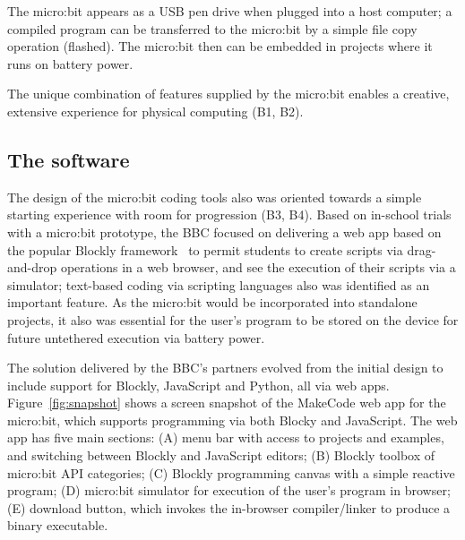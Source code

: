The micro:bit appears as a USB pen drive when plugged into a host computer;
a compiled program can be transferred to the micro:bit by a simple file copy
operation (flashed). The micro:bit then can be embedded in projects
where it runs on battery power.

The unique combination of features supplied by the micro:bit enables a creative,
extensive experience for physical computing (B1, B2). 

\subsection{The software}

The design of the micro:bit coding tools also was oriented towards a
simple starting experience with room for progression (B3, B4). Based on in-school trials with a micro:bit prototype, the BBC focused on delivering a web app
based on the popular Blockly framework~\cite{Blocky2015} to permit students to
create scripts via drag-and-drop operations in a web browser, and see
the execution of their scripts via a simulator; text-based coding via scripting languages also
was identified as an important feature. As the micro:bit would be incorporated
into standalone projects, it also was essential for the user's program to be stored on the device for future untethered execution via battery power.



The solution delivered by the BBC's partners evolved from the initial
design to include support for Blockly, JavaScript and Python, all
via web apps.
Figure~\ref{fig:snapshot} shows a screen snapshot of the MakeCode web app
for the micro:bit,
which supports programming via both Blocky and JavaScript.
The web app has five main sections: (A) menu bar with access to projects
and examples, and switching between Blockly and JavaScript editors; (B)
Blockly toolbox of micro:bit API categories; (C) Blockly programming
canvas with a simple reactive program; (D) micro:bit simulator for execution
of the user's program in browser; (E) download button, which invokes the in-browser
compiler/linker to produce a binary executable.

